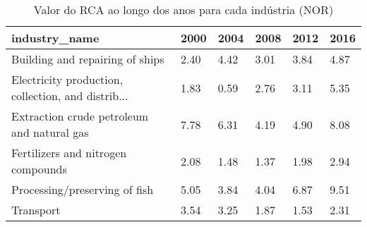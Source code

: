 \begin{table}
\centering
\caption{Valor do RCA ao longo dos anos para cada indústria (NOR)}
\begin{tabular}{p{6cm}p{1.5cm}p{1.5cm}p{1.5cm}p{1.5cm}p{1.5cm}}
\toprule
                                     industry\_name & 2000 & 2004 & 2008 & 2012 & 2016 \\
\midrule
                   Building and repairing of ships & 2.40 & 4.42 & 3.01 & 3.84 & 4.87 \\
Electricity production, collection, and distrib... & 1.83 & 0.59 & 2.76 & 3.11 & 5.35 \\
        Extraction crude petroleum and natural gas & 7.78 & 6.31 & 4.19 & 4.90 & 8.08 \\
                Fertilizers and nitrogen compounds & 2.08 & 1.48 & 1.37 & 1.98 & 2.94 \\
                     Processing/preserving of fish & 5.05 & 3.84 & 4.04 & 6.87 & 9.51 \\
                                         Transport & 3.54 & 3.25 & 1.87 & 1.53 & 2.31 \\
\bottomrule
\end{tabular}
\end{table}

